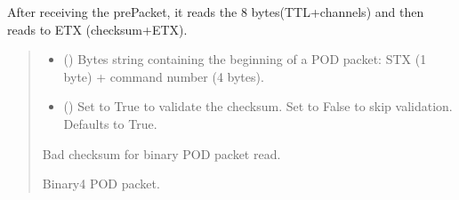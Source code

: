 \documentclass[letterpaper,10pt,english]{sphinxmanual}
\begin{document}
\begin{fulllineitems}
\begin{fulllineitems}
\begin{quote}
\begin{description}
\end{description}\end{quote}

\end{fulllineitems}


\begin{fulllineitems}
\label{\detokenize{PodApi.Devices:PodApi.Devices.PodDevice_8206HR.Pod8206HR._Read_Binary}}
\pysigstartsignatures
{}
\pysigstopsignatures
\sphinxAtStartPar
After receiving the prePacket, it reads the 8 bytes(TTL+channels) and then reads to ETX         (checksum+ETX).
\begin{quote}\begin{description}
\begin{itemize}
\item {} 
\sphinxAtStartPar
{} () \textendash{} Bytes string containing the beginning of a POD packet: STX (1 byte)                 + command number (4 bytes).

\item {} 
\sphinxAtStartPar
{} (\sphinxstyleliteralemphasis{\sphinxupquote{, }}) \textendash{} Set to True to validate the checksum. Set to False to                 skip validation. Defaults to True.

\end{itemize}

\sphinxAtStartPar
{} \textendash{} Bad checksum for binary POD packet read.

\sphinxAtStartPar
Binary4 POD packet.


\end{description}
\end{quote}
\end{fulllineitems}
\end{fulllineitems}
\end{document}
